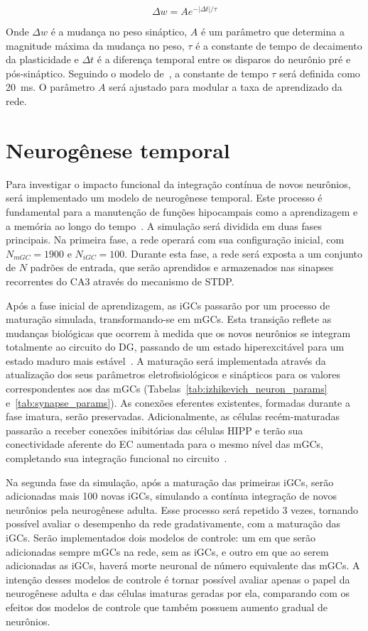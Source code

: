 \begin{equation}
    \label{eq:stdp}
    \Delta w = A e^{-|\Delta t|/\tau}
\end{equation}

Onde $\Delta w$ é a mudança no peso sináptico, $A$ é um parâmetro que determina a magnitude máxima da mudança no peso, $\tau$ é a
constante de tempo de decaimento da plasticidade e $\Delta t$ é a diferença temporal entre os disparos do neurônio pré e
pós-sináptico. Seguindo o modelo de~\cite{kopsickFormation2024}, a constante de tempo $\tau$ será definida como
\SI{20}{\milli\second}. O parâmetro $A$ será ajustado para modular a taxa de aprendizado da rede.

\section{Neurogênese temporal}

Para investigar o impacto funcional da integração contínua de novos neurônios, será implementado um modelo de neurogênese
temporal. Este processo é fundamental para a manutenção de funções hipocampais como a aprendizagem e a memória ao longo do
tempo~\cite{aimoneRegulation2014, berdugo-vegaSharpening2023}. A simulação será dividida em duas fases principais. Na primeira
fase, a rede operará com sua configuração inicial, com $N_{mGC} = 1900$ e $N_{iGC} = 100$. Durante esta fase, a rede será exposta
a um conjunto de $N$ padrões de entrada, que serão aprendidos e armazenados nas sinapses recorrentes do CA3 através do mecanismo
de STDP.

Após a fase inicial de aprendizagem, as iGCs passarão por um processo de maturação simulada, transformando-se em mGCs. Esta
transição reflete as mudanças biológicas que ocorrem à medida que os novos neurônios se integram totalmente ao circuito do DG,
passando de um estado hiperexcitável para um estado maduro mais estável~\cite{abbottAdult2020}. A maturação será implementada
através da atualização dos seus parâmetros eletrofisiológicos e sinápticos para os valores correspondentes aos das mGCs
(Tabelas~\ref{tab:izhikevich_neuron_params} e~\ref{tab:synapse_params}). As conexões eferentes existentes, formadas durante a fase
imatura, serão preservadas. Adicionalmente, as células recém-maturadas passarão a receber conexões inibitórias das células HIPP e
terão sua conectividade aferente do EC aumentada para o mesmo nível das mGCs, completando sua integração funcional no
circuito~\cite{lunaAdultborn2019}.

Na segunda fase da simulação, após a maturação das primeiras iGCs, serão adicionadas mais 100 novas iGCs, simulando a contínua
integração de novos neurônios pela neurogênese adulta. Esse processo será repetido 3 vezes, tornando possível avaliar o desempenho
da rede gradativamente, com a maturação das iGCs. Serão implementados dois modelos de controle: um em que serão adicionadas sempre
mGCs na rede, sem as iGCs, e outro em que ao serem adicionadas as iGCs, haverá morte neuronal de número equivalente das mGCs. A
intenção desses modelos de controle é tornar possível avaliar apenas o papel da neurogênese adulta e das células imaturas geradas
por ela, comparando com os efeitos dos modelos de controle que também possuem aumento gradual de neurônios.


